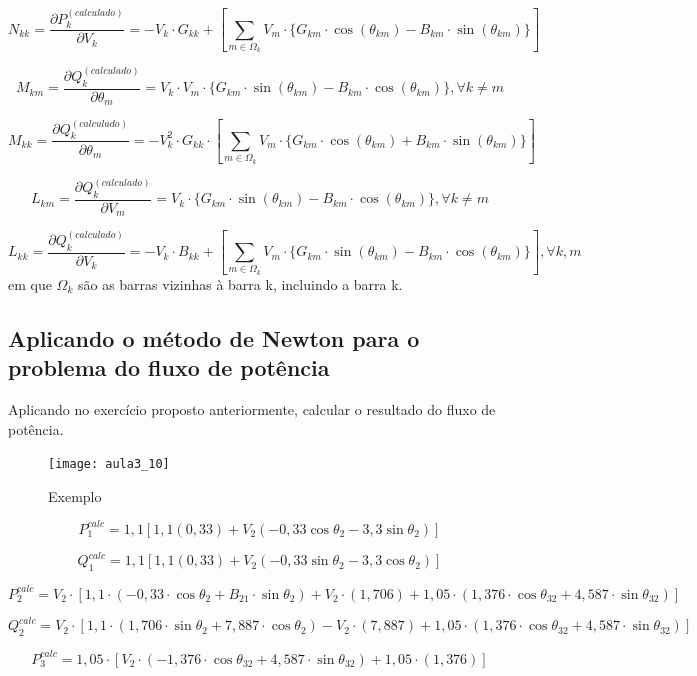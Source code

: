 \[
N_{kk}=\frac{\partial P_{k}^{(calculado)}}{\partial V_{k}}=-V_{k}\cdot G_{kk}+\left[\sum_{m\in\Omega_{k}}V_{m}\cdot\{G_{km}\cdot\cos(\theta_{km})-B_{km}\cdot\sin(\theta_{km})\}\right]
\]


\[
M_{km}=\frac{\partial Q_{k}^{(calculado)}}{\partial\theta_{m}}=V_{k}\cdot V_{m}\cdot\{G_{km}\cdot\sin(\theta_{km})-B_{km}\cdot\cos(\theta_{km})\},\forall k\neq m
\]


\[
M_{kk}=\frac{\partial Q_{k}^{(calculado)}}{\partial\theta_{m}}=-V_{k}^{2}\cdot G_{kk}\cdot\left[\sum_{m\in\Omega_{k}}V_{m}\cdot\{G_{km}\cdot\cos(\theta_{km})+B_{km}\cdot\sin(\theta_{km})\}\right]
\]


\[
L_{km}=\frac{\partial Q_{k}^{(calculado)}}{\partial V_{m}}=V_{k}\cdot\{G_{km}\cdot\sin(\theta_{km})-B_{km}\cdot\cos(\theta_{km})\},\forall k\neq m
\]


\[
L_{kk}=\frac{\partial Q_{k}^{(calculado)}}{\partial V_{k}}=-V_{k}\cdot B_{kk}+\left[\sum_{m\in\Omega_{k}}V_{m}\cdot\{G_{km}\cdot\sin(\theta_{km})-B_{km}\cdot\cos(\theta_{km})\}\right],\forall k,m
\]
em que $\Omega_{k}$ são as barras vizinhas à barra k, incluindo a barra k.

\subsection{Aplicando o método de Newton para o problema do fluxo de potência}

Aplicando no exercício proposto anteriormente, calcular o resultado
do fluxo de potência.
\begin{figure}[H]
\begin{centering}
\texttt{[image: aula3\_10]}\protect\caption{\label{fig:aula3_10} Exemplo }
\end{centering}
\end{figure}

\[
P_{1}^{calc}=1,1[1,1(0,33)+V_{2}(-0,33\cos\theta_{2}-3,3\sin\theta_{2})]
\]


\[
Q_{1}^{calc}=1,1[1,1(0,33)+V_{2}(-0,33\sin\theta_{2}-3,3\cos\theta_{2})]
\]


\[
P_{2}^{calc}=V_{2}\cdot[1,1\cdot(-0,33\cdot\cos\theta_{2}+B_{21}\cdot\sin\theta_{2})+V_{2}\cdot(1,706)+1,05\cdot(1,376\cdot\cos\theta_{32}+4,587\cdot\sin\theta_{32})]
\]


\[
Q_{2}^{calc}=V_{2}\cdot[1,1\cdot(1,706\cdot\sin\theta_{2}+7,887\cdot\cos\theta_{2})-V_{2}\cdot(7,887)+1,05\cdot(1,376\cdot\cos\theta_{32}+4,587\cdot\sin\theta_{32})]
\]


\[
P_{3}^{calc}=1,05\cdot[V_{2}\cdot(-1,376\cdot\cos\theta_{32}+4,587\cdot\sin\theta_{32})+1,05\cdot(1,376)]
\]


